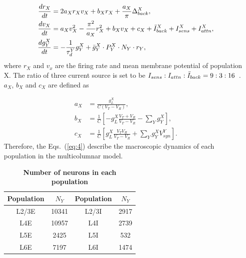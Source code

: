 \documentclass[10pt,letterpaper]{article}
\begin{document}
\begin{subequations}
\label{eq:4}
\begin{align}
    \frac{dr_{X}}{dt} &= 2a_{X}r_{X}v_{X} + b_{X}r_{X} + \frac{a_{X}}{\pi}\Delta_{back}^{X}, \label{eq:4a}\\
    \frac{dv_{X}}{dt} &= a_{X}v_{X}^{2} - \frac{\pi^{2}}{a_{X}}r_{X}^{2} + b_{X}v_{X} + c_{X} + \Bar{I}_{back}^{X} + I_{sens}^{X} + I_{attn}^{X},  \label{eq:4b}\\
    \frac{dg_{Y}^{X}}{dt} &= -\frac{1}{\tau_{d}^{Y}}g_{Y}^{X} + \Bar{g}_{Y}^{X}\cdot P_{Y}^{X}\cdot N_{Y}\cdot r_{Y}, \label{eq:4c}
\end{align}
\end{subequations}
where $r_{X}$ and $v_{x}$ are the firing rate and mean membrane potential of population X. The ratio of three current source is set to be $I_{sens}:I_{attn}:\Bar{I}_{back}=9:3:16$~\cite{wagatsuma2011}. $a_{X}$, $b_{X}$ and $c_{X}$ are defined as

\begin{subequations}
\label{eq:5}
\begin{align}
    a_{X}& = \frac{g_{L}^{X}}{C(V_{T}-V_{R})}, \label{eq:5a}\\
    b_{X}& = \frac{1}{C} \left[ -g_{L}^{X}\frac{V_{T}+V_{R}}{V_{T}-V_{R}}-\sum_{Y}g_{Y}^{X} \right],  \label{eq:5b}\\
    c_{X}& = \frac{1}{C} \left[ g_{L}^{X}\frac{V_{T}V_{R}}{V_{T}-V_{R}}+\sum_{Y}g_{Y}^{X}V_{syn}^{Y} \right]. \label{eq:5c}
\end{align}
\end{subequations}
Therefore, the Eqs.~(\ref{eq:4}) describe the macroscopic dynamics of each population in the multicolumnar model.

\begin{table}[!ht]
\centering
\caption{
{\bf Number of neurons in each population}}
\begin{tabular}[t]{cccc}
\toprule
Population & $N_{Y}$ & Population & $N_{Y}$\\
\midrule
L2/3E & 10341 & L2/3I & 2917 \\
L4E & 10957 & L4I & 2739 \\
L5E & 2425 & L5I & 532 \\
L6E & 7197 & L6I & 1474 \\
\bottomrule
\end{tabular}
\label{table1}
\end{table}
\end{document}

